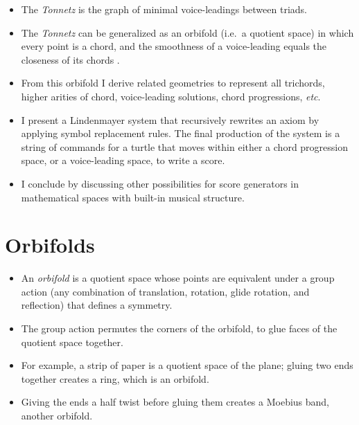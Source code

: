 \documentclass[14pt,letterpaper,onecolumn]{scrartcl}
\begin{document}
\begin{itemize}

\item The \emph{Tonnetz} is the graph of minimal voice-leadings between triads. 

\item The \emph{Tonnetz} can be generalized as an orbifold (i.e.\ a quotient space) in which every point is a chord, and the smoothness of a voice-leading equals the closeness of its chords \cite{geometryofchords}. 

\item From this orbifold I derive related geometries to represent all trichords, higher arities of chord, voice-leading solutions, chord progressions, \emph{etc}. 

\item I present a Lindenmayer system that recursively rewrites an axiom by applying symbol replacement rules. The final production of the system is a string of commands for a turtle that moves within either a chord progression space, or a voice-leading space, to write a score.

\item I conclude by discussing other possibilities for score generators in mathematical spaces with built-in musical structure.

\end{itemize}

\section{Orbifolds}

\begin{itemize}

\item An \emph{orbifold} is a quotient space whose points are equivalent under a group action (any combination of translation, rotation, glide rotation, and reflection) that defines a symmetry. 

\item The group action permutes the corners of the orbifold, to glue faces of the quotient space together. 

\item For example, a strip of paper is a quotient space of the plane; gluing two ends together creates a ring, which is an orbifold. 

\item Giving the ends a half twist before gluing them creates a Moebius band, another orbifold.

\end{itemize}
\end{document}

